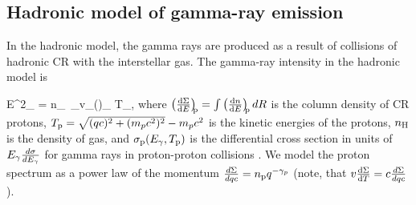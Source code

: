 

\subsection{Hadronic model of gamma-ray emission}
\label{sec:Pion_model}

In the hadronic model, the gamma rays are produced as a result of collisions of hadronic CR with the interstellar gas.
The gamma-ray intensity in the hadronic model is

\be
E^2_\g {} =  \int n_\Hy\ \sigma_\pr v_\pr \left(\right)_{\!\!\pr} \de T_\pr,
\ee
where $\left(\frac{\text{d} \Sigma}{\text{d} E}\right)_{\!\!\text{p}} = \int \left(\frac{\text{d} n}{\text{d} E}\right)_{\!\!\text{p}} dR$ is the column density 
of CR protons,
$T_{\text{p}} = \sqrt{(q c)^2 + (m_p c^2)^2} - m_p c^2$ is the kinetic energies of the protons,
$n_{\text{H}}$ is the density of gas, and $\sigma_{\text{p}} (E_\gamma, T_{\text{p}})$ is 
the differential cross section in units of $E_\gamma\frac{d\sigma}{d E_\gamma}$
for gamma rays in proton-proton collisions \citep{2006ApJ...647..692K, 2008ApJ...674..278K}.
We model the proton spectrum as a power law of the momentum $\frac{d \Sigma}{d qc} = n_{\text{p}} q^{-\gamma_p}$ 
(note, that $ v \frac{\text{d} \Sigma}{\text{d} T} = c \frac{d \Sigma}{d qc}$).

